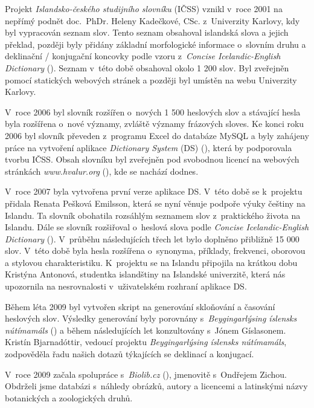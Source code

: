 Projekt \textit{Islandsko-českého studijního slovníku} (IČSS) vznikl v~roce 2001 na nepřímý podnět doc. PhDr. Heleny Kadečkové, CSc. z~Univerzity Karlovy,
kdy byl vypracován seznam slov. 
Tento seznam obsahoval islandská slova a jejich překlad, později byly přidány základní morfologické informace o~slovním druhu a deklinační / konjugační koncovky podle vzoru z~\textit{Concise Icelandic-English Dictionary} (\cite {ic_en}). 
Seznam v~této době obsahoval okolo 1 200 slov. Byl zveřejněn pomocí statických webových stránek a později byl umístěn na webu Univerzity Karlovy. 

V~roce 2006 byl slovník rozšířen o~nových 1 500 heslových slov a stávající hesla byla rozšířena o~nové významy, zvláště významy frázových sloves. 
Ke konci roku 2006  byl slovník převeden z programu Excel do databáze MySQL a byly zahájeny práce na vytvoření aplikace \textit{Dictionary System} (DS) (\cite {int19}), která by podporovala tvorbu IČSS. 
Obsah slovníku byl zveřejněn pod svobodnou licencí na webových stránkách \textit{www.hvalur.org} (\cite {int14}), kde se nachází dodnes. 

V~roce 2007 byla vytvořena první verze aplikace DS. V~této době se k~projektu přidala Renata Pešková Emilsson, která se nyní věnuje podpoře výuky češtiny na Islandu. 
Ta slovník obohatila rozsáhlým seznamem slov z~praktického života na Islandu. Dále se slovník rozšiřoval o~heslová slova podle \textit{Concise Icelandic-English Dictionary} (\cite {ic_en}). 
V průběhu následujících třech let bylo doplněno přibližně 15 000 slov. V této době byla hesla rozšířena o~synonyma, příklady, frekvenci, oborovou a stylovou charakteristiku. K projektu se na Islandu připojila na krátkou dobu Kristýna Antonová, studentka islandštiny na Islandské univerzitě, která 
nás upozornila na nesrovnalosti v~uživatelském rozhraní aplikace DS.

Během léta 2009 byl vytvořen skript na generování skloňování a časování heslových slov. Výsledky generování byly porovnány s~\textit{Beygingarlýsing íslensks nútímamáls} (\cite {DalvikVM}) a během následujících let konzultovány
s~Jónem Gíslasonem. Kristín Bjarnadóttir, vedoucí projektu \textit{Beygingarlýsing íslensks nútímamáls}, zodpověděla řadu našich dotazů týkajících se deklinací a konjugací.

V~roce 2009 začala spolupráce s~\textit{Biolib.cz} (\cite {int5}), jmenovitě s~Ondřejem Zichou. Obdrželi jsme  databázi s~náhledy obrázků, autory a licencemi a latinskými názvy botanických a zoologických druhů.


